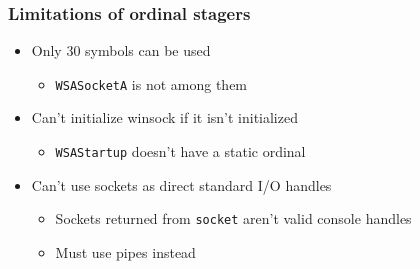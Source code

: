 \documentclass{beamer}
\newenvironment{sitemize}{\vspace{1mm}\begin{itemize}\itemsep 4pt\small}{\end{itemize}}
\begin{document}
\begin{frame}[t]
    \frametitle{Limitations of ordinal stagers}

    \begin{sitemize}
        \item Only 30 symbols can be used
        \begin{sitemize}
            \item \texttt{WSASocketA} is not among them
        \end{sitemize}

        \pause
        \item Can't initialize winsock if it isn't initialized
        \begin{sitemize}
            \item \texttt{WSAStartup} doesn't have a static ordinal
        \end{sitemize}

        \pause
        \item Can't use sockets as direct standard I/O handles
        \begin{sitemize}
            \item Sockets returned from \texttt{socket} aren't valid
            console handles
            \item Must use pipes instead
        \end{sitemize}
    \end{sitemize}
\end{frame}
\end{document}
